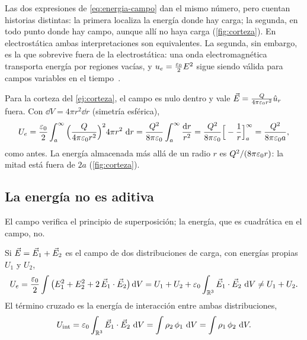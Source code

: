 \begin{observacion}\label{obs:localizacion}
Las dos expresiones de \eqref{eq:energia-campo} dan el mismo número, pero cuentan historias distintas: la primera localiza la energía
donde hay carga; la segunda, en todo punto donde hay campo, aunque allí no haya carga (\cref{fig:corteza}). En electrostática ambas
interpretaciones son equivalentes. La segunda, sin embargo, es la que sobrevive fuera de la electrostática: una onda
electromagnética transporta energía por regiones vacías, y $u_e=\frac{\varepsilon_0}{2}E^2$ sigue siendo válida para campos variables en el
tiempo~\cite{Griffiths,Jackson}.
\end{observacion}

\begin{ejemplo}\label{ej:corteza-campo}
Para la corteza del \cref{ej:corteza}, el campo es nulo dentro y vale $\vec E=\frac{Q}{4\pi\varepsilon_0 r^2}\hat u_{r}$ fuera. Con $\dd V=4\pi r^2\dd r$ (simetría
esférica),
\[
  U_e=\frac{\varepsilon_0}{2}\int_a^\infty\Big(\frac{Q}{4\pi\varepsilon_0 r^2}\Big)^2 4\pi r^2\,\mathop{}\!\mathrm{d} r=\frac{Q^2}{8\pi\varepsilon_0}\int_a^\infty\frac{\mathop{}\!\mathrm{d} r}{r^2}
     =\frac{Q^2}{8\pi\varepsilon_0}\Big[-\frac1r\Big]_a^\infty=\frac{Q^2}{8\pi\varepsilon_0 a},
\]
como antes. La energía almacenada más allá de un radio $r$ es $Q^2/(8\pi\varepsilon_0 r)$: la mitad está fuera de $2a$ (\cref{fig:corteza}).
\end{ejemplo}



\subsection{La energía no es aditiva}

El campo verifica el principio de superposición; la energía, que es cuadrática en el campo, no.

\begin{proposicion}\label{prop:no-aditiva}
Si $\vec E=\vec E_1+\vec E_2$ es el campo de dos distribuciones de carga, con energías propias $U_1$ y $U_2$,
\begin{equation}\label{eq:no-aditiva}
  U_e=\frac{\varepsilon_0}{2}\int\big(E_1^2+E_2^2+2\,\vec E_1\cdot\vec E_2\big)\mathop{}\!\mathrm{d} V=U_1+U_2+\varepsilon_0\int_{\mathbb R^3}\vec E_1\cdot\vec E_2\,\mathop{}\!\mathrm{d} V\neq U_1+U_2 .
\end{equation}
El término cruzado es la energía de interacción entre ambas distribuciones,
\begin{equation}\label{eq:cruzado}
  U_{\mathrm{int}}=\varepsilon_0\int_{\mathbb R^3}\vec E_1\cdot\vec E_2\,\mathop{}\!\mathrm{d} V=\int\rho_2\,\phi_1\,\mathop{}\!\mathrm{d} V=\int\rho_1\,\phi_2\,\mathop{}\!\mathrm{d} V .
\end{equation}
\end{proposicion}

